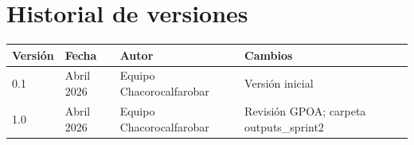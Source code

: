 \documentclass[12pt,a4paper]{article}
\begin{document}
\section{Historial de versiones}

\begin{table}[H]
\centering
\begin{tabular}{llll}
\toprule
\textbf{Versión} & \textbf{Fecha} & \textbf{Autor} & \textbf{Cambios} \\
\midrule
0.1 & Abril 2026 & Equipo Chacorocalfarobar & Versión inicial \\
1.0 & Abril 2026 & Equipo Chacorocalfarobar & Revisión GPOA; carpeta outputs\_sprint2 \\
\bottomrule
\end{tabular}
\end{table}
\end{document}
